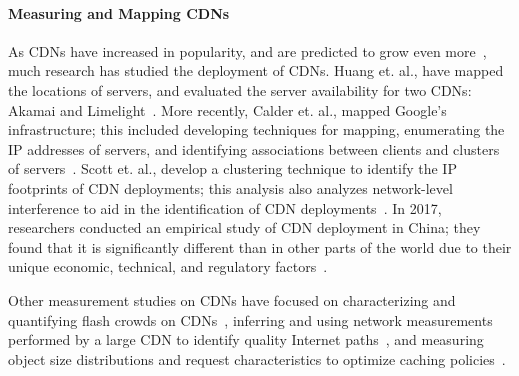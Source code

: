 \paragraph{Measuring and Mapping CDNs} As CDNs have increased in popularity, and are predicted to grow even more~\cite{predict}, much research has 
studied the deployment of CDNs.  Huang et. al., have mapped the locations of servers, and evaluated the server availability for two CDNs: 
Akamai and Limelight~\cite{huang2008measuring}.  More recently, Calder et. al., mapped Google's infrastructure; this included 
developing techniques for mapping, enumerating the IP addresses of servers, and identifying associations between clients and clusters of 
servers~\cite{calder2013mapping}. Scott et. al., develop a clustering technique to identify the IP footprints of CDN deployments; this analysis
 also analyzes network-level interference to aid in the identification of CDN deployments~\cite{scott2016satellite}.  In 2017, researchers 
conducted an empirical study of CDN deployment in China; they found that it is significantly different than in other parts of the world 
due to their unique economic, technical, and regulatory factors~\cite{xue2017cdns}. 

Other measurement studies on CDNs have focused on characterizing and quantifying flash crowds on CDNs~\cite{wendell2011going}, inferring 
and using network measurements performed by a large CDN to identify quality Internet paths~\cite{su2009drafting}, and measuring object size distributions and 
request characteristics to optimize caching policies~\cite{berger2017adaptsize}.
